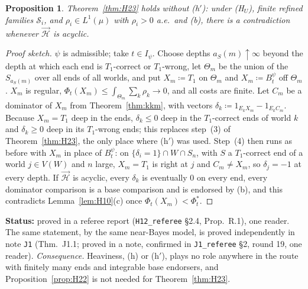 \documentclass[11pt]{article}
\newtheorem{proposition}[theorem]{Proposition}
\theoremstyle{definition}
\theoremstyle{remark}
\newcommand{\src}[1]{\texttt{#1}}
\newcommand{\status}[1]{\par\smallskip\noindent\textbf{Status:} #1\par\smallskip}
\begin{document}
\begin{proposition}\label{prop:HR1}
Theorem~\ref{thm:H23} holds without (h$'$): under (H$_U$), finite refined families $\mathcal S_i$, and $\rho_i\in L^1(\mu)$ with $\rho_i>0$ a.e.\ and (b), there is a contradiction whenever $\vec{\mathcal H}$ is acyclic.
\end{proposition}
\begin{proof}[Proof sketch]
$\psi$ is admissible; take $t\in I_\psi$. Choose depths $a_S(m)\uparrow\infty$ beyond the depth at which each end is $T_1$-correct or $T_1$-wrong, let $\Theta_m$ be the union of the $S_{a_S(m)}$ over all ends of all worlds, and put $X_m\coloneqq T_1$ on $\Theta_m$ and $X_m\coloneqq B^\psi_t$ off $\Theta_m$. $X_m$ is regular, $\Phi_t(X_m)\le\int_{\Theta_m}\sum_k\rho_k\to0$, and all costs are finite. Let $C_m$ be a dominator of $X_m$ from Theorem~\ref{thm:kkm}, with vectors $\delta_k\coloneqq1_{E_kX_m}-1_{E_kC_m}$. Because $X_m=T_1$ deep in the ends, $\delta_k\le0$ deep in the $T_1$-correct ends of world $k$ and $\delta_k\ge0$ deep in its $T_1$-wrong ends; this replaces step~(3) of Theorem~\ref{thm:H23}, the only place where (h$'$) was used. Step~(4) then runs as before with $X_m$ in place of $B^\psi_t$: on $\{\delta_i=1\}\cap W\cap S_n$, with $S$ a $T_1$-correct end of a world $j\in V(W)$ and $n$ large, $X_m=T_1$ is right at $j$ and $C_m\ne X_m$, so $\delta_j=-1$ at every depth. If $\vec{\mathcal H}$ is acyclic, every $\delta_k$ is eventually $0$ on every end, every dominator comparison is a base comparison and is endorsed by (b), and this contradicts Lemma~\ref{lem:H10}(c) once $\Phi_t(X_m)<\Phi^*_t$.
\end{proof}
\status{proved in a referee report (\src{H12\_referee} \S2.4, Prop.~R.1), one reader. The same statement, by the same near-Bayes model, is proved independently in note \src{J1} (Thm.~J1.1; proved in a note, confirmed in \src{J1\_referee} \S2, round 19, one reader). \emph{Consequence.} Heaviness, (h) or (h$'$), plays no role anywhere in the route with finitely many ends and integrable base endorsers, and Proposition~\ref{prop:H22} is not needed for Theorem~\ref{thm:H23}.}
\end{document}
